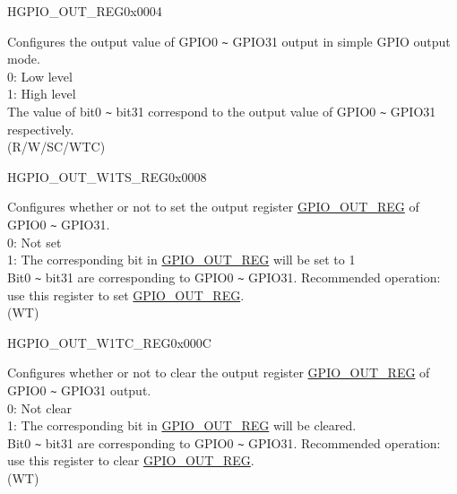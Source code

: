 \begin{register}{H}{GPIO\_OUT\_REG}{0x0004}\label{regdesc:GPIOOUTREG}
%
\regnewline%
\begin{regdesc}\begin{reglist}
\label{fielddesc:GPIOOUTDATAORIG}\item [GPIO\_OUT\_DATA\_ORIG] Configures the output value of GPIO0 \verb+~+ GPIO31 output in simple GPIO output mode.\\
0: Low level\\
1: High level\\
The value of bit0 \verb+~+ bit31 correspond to the output value of GPIO0 \verb+~+ GPIO31 respectively. \\
(R/W/SC/WTC)
\end{reglist}\end{regdesc}
\end{register}


\begin{register}{H}{GPIO\_OUT\_W1TS\_REG}{0x0008}\label{regdesc:GPIOOUTW1TSREG}
%
\regnewline%
\begin{regdesc}\begin{reglist}
\label{fielddesc:GPIOOUTW1TS}\item [GPIO\_OUT\_W1TS] Configures whether or not to set the output register \hyperref[regdesc:GPIOOUTREG]{GPIO\_OUT\_REG} of GPIO0 \verb+~+ GPIO31.\\
0: Not set\\
1: The corresponding bit in \hyperref[regdesc:GPIOOUTREG]{GPIO\_OUT\_REG} will be set to 1\\
Bit0 \verb+~+ bit31 are corresponding to GPIO0 \verb+~+ GPIO31.
Recommended operation: use this register to set \hyperref[regdesc:GPIOOUTREG]{GPIO\_OUT\_REG}. \\
(WT)
\end{reglist}\end{regdesc}
\end{register}


\begin{register}{H}{GPIO\_OUT\_W1TC\_REG}{0x000C}\label{regdesc:GPIOOUTW1TCREG}
%
\regnewline%
\begin{regdesc}\begin{reglist}
\label{fielddesc:GPIOOUTW1TC}\item [GPIO\_OUT\_W1TC] Configures whether or not to clear the output register \hyperref[regdesc:GPIOOUTREG]{GPIO\_OUT\_REG} of GPIO0 \verb+~+ GPIO31 output.\\
0: Not clear\\
1: The corresponding bit in \hyperref[regdesc:GPIOOUTREG]{GPIO\_OUT\_REG} will be cleared.\\
Bit0 \verb+~+ bit31 are corresponding to GPIO0 \verb+~+ GPIO31.
Recommended operation: use this register to clear \hyperref[regdesc:GPIOOUTREG]{GPIO\_OUT\_REG}. \\
(WT)
\end{reglist}\end{regdesc}
\end{register}



